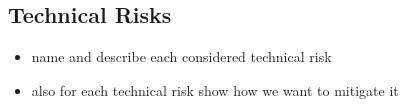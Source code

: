 \subsection{Technical Risks}


\begin{itemize}
    \item name and describe each considered technical risk 
    \item also for each technical risk show how we want to mitigate it
\end{itemize}

